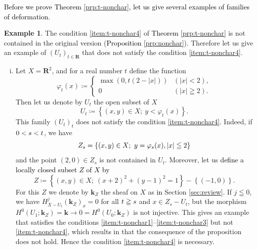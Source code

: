 ﻿\documentclass[a4paper,leqno,dvipdfmx]{jsarticle}
\theoremstyle{definition}
\newtheorem{Example+}[Axiom+]{Example}
\newcommand{\rr}{\mathbf{R}}
\newcommand{\kk}{\mathbf{k}}
\numberwithin{equation}{section}
\theoremstyle{mystyle}
\begin{document}
\textcolor{black}{Before we prove Theorem \ref{prp:t-nonchar}, 
let us give several examples of families of deformation. 
}
\begin{Example+}\label{eg:t-nonchar}
  The condition \eqref{item:t-nonchar4} of 
  \textcolor{black}{Theorem \ref{prp:t-nonchar}} is not contained 
  in the original version (\textcolor{black}{Proposition \ref{prp:nonchar}}). 
  Therefore let us give an example of \(\left(U_{t}\right)_{t\in\rr}\) 
  that does not satisfy the condition \eqref{item:t-nonchar4}. 
  \begin{enumerate}[(i)]
    \item \label{item:not-gentle} 
    Let \(X=\rr^2\), and for a real number \(t\) define the 
    function\[
      \varphi_{t}(x)\coloneqq\begin{cases}
        \max\left(0,t(2-\left|x\right|)\right)&(\left|x\right| < 2),\\
        0& (\left|x\right|\geqq 2).
      \end{cases}
    \]
    Then let us denote by \(U_{t}\) the open subset of \(X\)
    \[
      U_{t}\coloneqq
      \left\{
        (x,y)\in X;\ y<\varphi_{t}(x)
      \right\}. 
    \]
    This family \((U_{t})_{t}\) does not satisfy 
    the condition \eqref{item:t-nonchar4}. 
    Indeed, if \(\textcolor{black}{0<s<t}\), 
    we have 
    \[
      Z_{s}=\left\{
        (x,y)\in X;\ y=\varphi_{s}(x)\textcolor{black}{, \left|x\right|\leqq 2}
      \right\}
    \] and the point \((2,0)\in Z_{s}\) is 
    not contained in \(U_{t}\). 
    Moreover, let us \textcolor{black}{define 
    a locally closed subset \(Z\) of \(X\) by}
    \[
      Z\coloneqq \left\{(x,y)\in X;\ (x+2)^{2}+(y-1)^{2}=1\right\}- \left\{(-1,0)\right\}. 
    \]
    For this \(Z\) 
    we denote by \(\kk_{Z}\) the sheaf on \(X\) as \textcolor{black}{in} Section \ref{sec:review}. 
    If \(j\leqq0\), we have \(
      H^{j}_{X- U_{t}}(\kk_{Z})_{x}=0
    \) for all \(\textcolor{black}{t \geqq s}\) and \(x\in Z_{s}- U_{t}\), 
    but the morphism \(
      H^{0}(U_{1};\kk_{Z})=\kk
      \to 
      0 = H^{0}(U_{0};\kk_{Z})
    \) is not injective. 
    This gives an example that 
    satisfies the conditions 
    \eqref{item:t-nonchar1}--\eqref{item:t-nonchar3} but 
    not \eqref{item:t-nonchar4}, 
    which result\textcolor{black}{s} in that 
    the consequence of the proposition does not hold. 
    Hence the condition \eqref{item:t-nonchar4} is necessary. 
    \begin{figure}[htb]
      \centering
\end{figure}
\end{enumerate}
\end{Example+}
\end{document}
